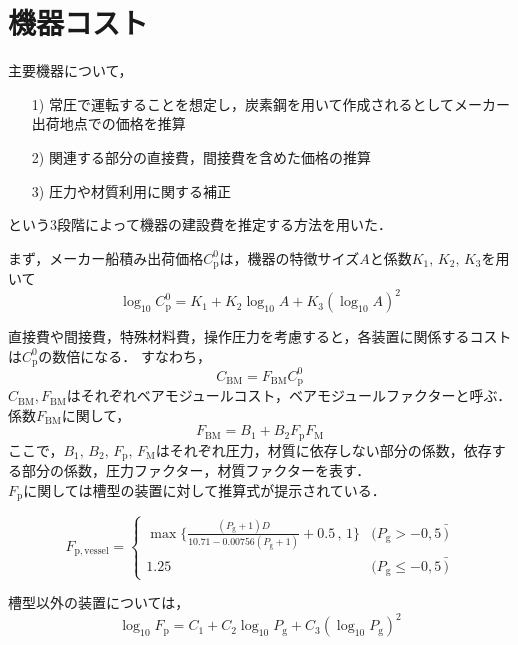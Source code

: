 \documentclass[a4j]{jsreport}
\begin{document}
\section{機器コスト}
主要機器について，
\begin{itemize}
    \item[1)]常圧で運転することを想定し，炭素鋼を用いて作成されるとしてメーカー出荷地点での価格を推算
    \item[2)]関連する部分の直接費，間接費を含めた価格の推算
    \item[3)]圧力や材質利用に関する補正
\end{itemize}
という3段階によって機器の建設費を推定する方法を用いた．
\par
まず，メーカー船積み出荷価格$C_\mathrm{p}^0$は，機器の特徴サイズ$A$と係数$K_1,\,K_2,\,K_3$を用いて
\begin{equation}
    \log_{10}C_\mathrm{p}^0 = K_1 + K_2\log_{10} A + K_3(\log_{10} A)^2
\end{equation}
\par
直接費や間接費，特殊材料費，操作圧力を考慮すると，各装置に関係するコストは$C_\mathrm{p}^0$の数倍になる．
すなわち，
\begin{equation}
    C_\mathrm{BM} = F_\mathrm{BM} C_\mathrm{p}^0
\end{equation}
$C_\mathrm{BM}$,\,$ F_\mathrm{BM}$はそれぞれベアモジュールコスト，ベアモジュールファクターと呼ぶ．
係数$F_\mathrm{BM}$に関して，
\begin{equation}
    F_\mathrm{BM} = B_1 + B_2 F_\mathrm{p} F_\mathrm{M}
\end{equation}
ここで，$B_1,\, B_2 ,\,F_\mathrm{p},\, F_\mathrm{M}$はそれぞれ圧力，材質に依存しない部分の係数，依存する部分の係数，圧力ファクター，材質ファクターを表す．\\
$F_\mathrm{p}$に関しては槽型の装置に対して推算式が提示されている．\\
\begin{center}
\begin{equation}
    F_\mathrm{p,vessel} =
        \begin{cases}
            \max\{\frac{(P_\mathrm{g}+1)D}{10.71-0.00756(P_\mathrm{g}+1)}+0.5 \,,\, 1\} & (P_\mathrm{g} > -0,5\, \bar) \\
            1.25 & (P_\mathrm{g} \leq -0,5\, \bar)
        \end{cases}
\end{equation}
\end{center}
槽型以外の装置については，
\begin{equation}
    \log_{10}F_\mathrm{p} = C_1 + C_2\log_{10} P_\mathrm{g} + C_3(\log_{10} P_\mathrm{g})^2
\end{equation}
\end{document}
